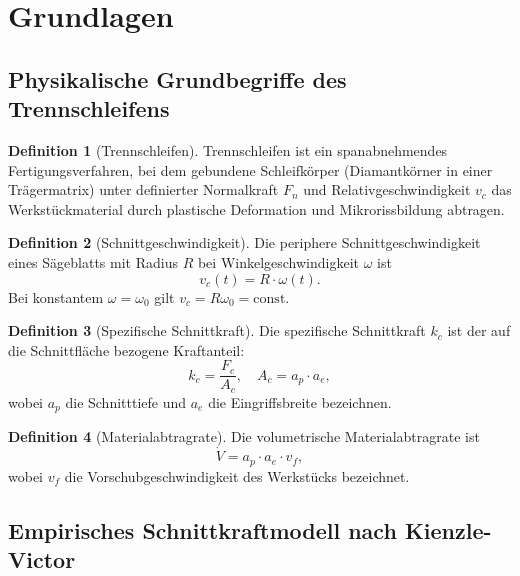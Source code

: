 ﻿\documentclass[a4paper,12pt]{article}
\theoremstyle{definition}
\newtheorem{definition}{Definition}
\begin{document}
\section{Grundlagen}
\label{sec:grundlagen}

\subsection{Physikalische Grundbegriffe des Trennschleifens}

\begin{definition}[Trennschleifen]
Trennschleifen ist ein spanabnehmendes Fertigungsverfahren, bei dem gebundene Schleifkörper
(Diamantkörner in einer Trägermatrix) unter definierter Normalkraft $F_n$ und Relativgeschwindigkeit
$v_c$ das Werkstückmaterial durch plastische Deformation und Mikrorissbildung abtragen.
\end{definition}

\begin{definition}[Schnittgeschwindigkeit]
Die periphere Schnittgeschwindigkeit eines Säge\-blatts mit Radius $R$ bei Winkelgeschwindigkeit
$\omega$ ist
\[
v_c(t) = R \cdot \omega(t).
\]
Bei konstantem $\omega = \omega_0$ gilt $v_c = R\omega_0 = \mathrm{const}$.
\end{definition}

\begin{definition}[Spezifische Schnittkraft]
Die spezifische Schnittkraft $k_c$ ist der auf die Schnittfläche bezogene Kraftanteil:
\[
k_c = \frac{F_c}{A_c}, \quad A_c = a_p \cdot a_e,
\]
wobei $a_p$ die Schnitttiefe und $a_e$ die Eingriffsbreite bezeichnen.
\end{definition}

\begin{definition}[Materialabtragrate]
Die volumetrische Materialabtragrate ist
\[
\dot{V} = a_p \cdot a_e \cdot v_f,
\]
wobei $v_f$ die Vorschubgeschwindigkeit des Werkstücks bezeichnet.
\end{definition}

\subsection{Empirisches Schnittkraftmodell nach Kienzle-Victor}
\end{document}
